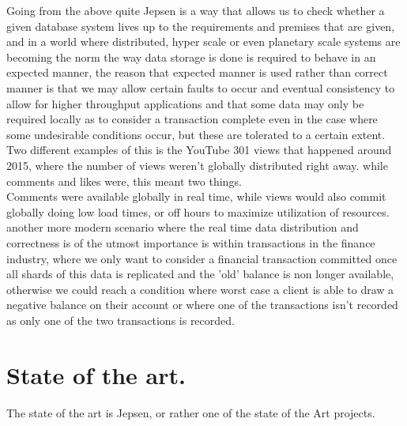 \documentclass[a4paper,10pt,titlepage]{report}
\begin{document}
Going from the above quite Jepsen is a way that allows us to check whether a given database system lives up to the requirements and premises that are given, and in a world where distributed, hyper scale or even planetary scale systems are becoming the norm the way data storage is done is required to behave in an expected manner, the reason that expected manner is used rather than correct manner is that we may allow certain faults to occur and eventual consistency to allow for higher throughput applications and that some data may only be required locally as to consider a transaction complete even in the case where some undesirable conditions occur, but these are tolerated to a certain extent. \\
\vspace{5mm}
Two different examples of this is the YouTube 301 views that happened around 2015, where the number of views weren't globally distributed right away. while comments and likes were, this meant two things. \\

Comments were available globally in real time, while views would also commit globally doing low load times, or off hours to maximize utilization of resources.\\
\vspace{5mm}
another more modern scenario where the real time data distribution and correctness is of the utmost importance is within transactions in the finance industry,  where we only want to consider a financial transaction committed once all shards of this data is replicated and the 'old' balance is non longer available, otherwise we could reach a condition where worst case a client is able to draw a negative balance on their account or where one of the transactions isn't recorded as only one of the two transactions is recorded.\\


\section{State of the art.}

The state of the art is Jepsen, or rather one of the state of the Art projects.
\end{document}
